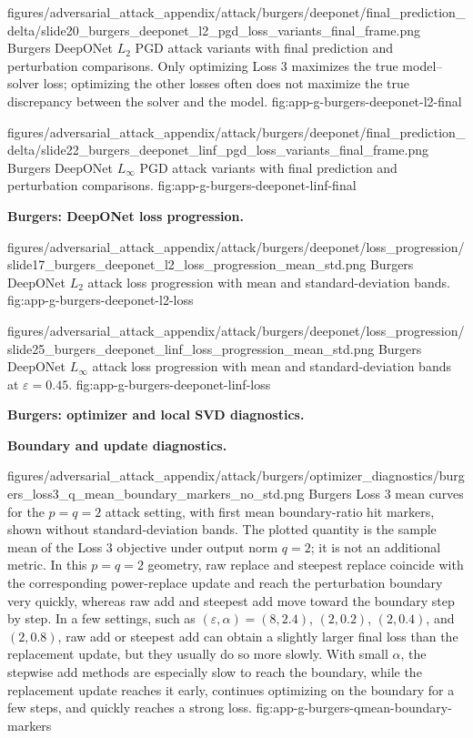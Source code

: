 \documentclass[letterpaper]{article} %
\begin{document}
\appendixattackfigcompact
  {figures/adversarial_attack_appendix/attack/burgers/deeponet/final_prediction_delta/slide20_burgers_deeponet_l2_pgd_loss_variants_final_frame.png}
  {Burgers DeepONet $L_2$ PGD attack variants with final prediction and
  perturbation comparisons. Only optimizing Loss 3 maximizes the true
  model--solver loss; optimizing the other losses often does not maximize the
  true discrepancy between the solver and the model.}
  {fig:app-g-burgers-deeponet-l2-final}

\appendixattackfigcompact
  {figures/adversarial_attack_appendix/attack/burgers/deeponet/final_prediction_delta/slide22_burgers_deeponet_linf_pgd_loss_variants_final_frame.png}
  {Burgers DeepONet $L_\infty$ PGD attack variants with final prediction and
  perturbation comparisons.}
  {fig:app-g-burgers-deeponet-linf-final}

\noindent\textbf{Burgers: DeepONet loss progression.}

\appendixattackfig
  {figures/adversarial_attack_appendix/attack/burgers/deeponet/loss_progression/slide17_burgers_deeponet_l2_loss_progression_mean_std.png}
  {Burgers DeepONet $L_2$ attack loss progression with mean and
  standard-deviation bands.}
  {fig:app-g-burgers-deeponet-l2-loss}

\appendixattackfig
  {figures/adversarial_attack_appendix/attack/burgers/deeponet/loss_progression/slide25_burgers_deeponet_linf_loss_progression_mean_std.png}
  {Burgers DeepONet $L_\infty$ attack loss progression with mean and
  standard-deviation bands at $\varepsilon=0.45$.}
  {fig:app-g-burgers-deeponet-linf-loss}

\clearpage
\noindent\textbf{Burgers: optimizer and local SVD diagnostics.}

\noindent\textbf{Boundary and update diagnostics.}

\appendixattackfig
  {figures/adversarial_attack_appendix/attack/burgers/optimizer_diagnostics/burgers_loss3_q_mean_boundary_markers_no_std.png}
  {Burgers Loss 3 mean curves for the $p=q=2$ attack setting, with first mean
  boundary-ratio hit markers, shown without standard-deviation bands. The
  plotted quantity is the sample mean of the Loss 3 objective under output
  norm $q=2$; it is not an additional metric. In this $p=q=2$ geometry, raw
  replace and steepest replace coincide with the corresponding power-replace
  update and reach the
  perturbation boundary very quickly, whereas raw add and steepest add move
  toward the boundary step by step. In a few settings, such as
  $(\varepsilon,\alpha)=(8,2.4)$, $(2,0.2)$, $(2,0.4)$, and $(2,0.8)$, raw add or
  steepest add can obtain a slightly larger final loss than the replacement
  update, but they usually do so more slowly. With small $\alpha$, the stepwise
  add methods are especially slow to reach the boundary, while the replacement
  update reaches it early, continues optimizing on the boundary for a few steps,
  and quickly reaches a strong loss.}
  {fig:app-g-burgers-qmean-boundary-markers}
\end{document}
